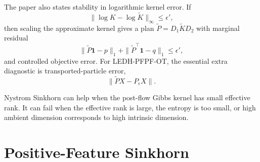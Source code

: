 \documentclass[11pt]{article}
\newcommand{\ones}{\mathbf{1}}
\begin{document}
The paper also states stability in logarithmic kernel error.  If
\begin{equation}
\|\log K-\log\tilde K\|_\infty \le \epsilon',
\label{eq:nystrom-log-error}
\end{equation}
then scaling the approximate kernel gives a plan
$\tilde P=D_1\tilde K D_2$ with marginal residual
\begin{equation}
\|\tilde P\ones-p\|_1
+\|\tilde P^\top\ones-q\|_1
\le \epsilon',
\label{eq:nystrom-marginal-residual}
\end{equation}
and controlled objective error.  For LEDH-PFPF-OT, the essential extra
diagnostic is transported-particle error,
\begin{equation}
\|\tilde P X-P_\epsilon X\|.
\label{eq:nystrom-transport-error}
\end{equation}

Nystrom Sinkhorn can help when the post-flow Gibbs kernel has small effective
rank.  It can fail when the effective rank is large, the entropy is too small,
or high ambient dimension corresponds to high intrinsic dimension.

\section{Positive-Feature Sinkhorn}
\end{document}
